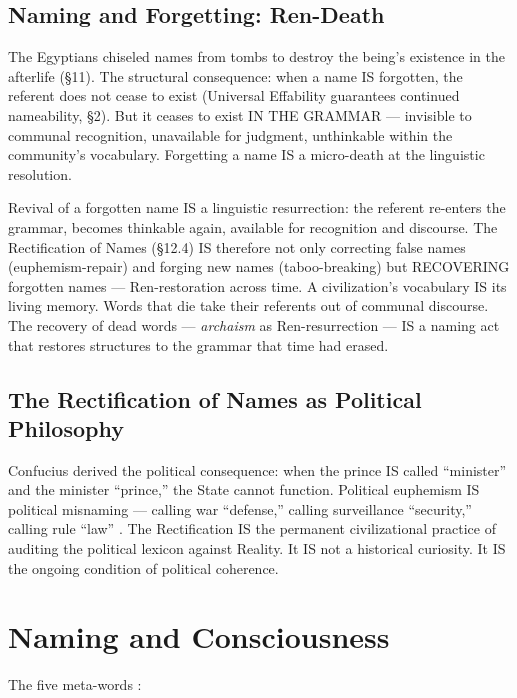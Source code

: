 \documentclass[11pt, oneside]{article}
\theoremstyle{definition}
\begin{document}
\subsection{Naming and Forgetting: Ren-Death}

The Egyptians chiseled names from tombs to destroy the being's existence in the afterlife (\S11). The structural consequence: when a name IS forgotten, the referent does not cease to exist (Universal Effability guarantees continued nameability, \S2). But it ceases to exist IN THE GRAMMAR --- invisible to communal recognition, unavailable for judgment, unthinkable within the community's vocabulary. Forgetting a name IS a micro-death at the linguistic resolution.

Revival of a forgotten name IS a linguistic resurrection: the referent re-enters the grammar, becomes thinkable again, available for recognition and discourse. The Rectification of Names (\S12.4) IS therefore not only correcting false names (euphemism-repair) and forging new names (taboo-breaking) but RECOVERING forgotten names --- Ren-restoration across time. A civilization's vocabulary IS its living memory. Words that die take their referents out of communal discourse. The recovery of dead words --- \textit{archaism} as Ren-resurrection --- IS a naming act that restores structures to the grammar that time had erased.

\subsection{The Rectification of Names as Political Philosophy}

Confucius \cite{confucius} derived the political consequence: when the prince IS called ``minister'' and the minister ``prince,'' the State cannot function. Political euphemism IS political misnaming --- calling war ``defense,'' calling surveillance ``security,'' calling rule ``law'' \cite{euphemology}. The Rectification IS the permanent civilizational practice of auditing the political lexicon against Reality. It IS not a historical curiosity. It IS the ongoing condition of political coherence.

\section{Naming and Consciousness}


The five meta-words \cite{codex2, codex3}:
\end{document}
